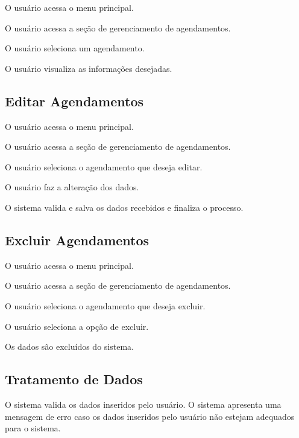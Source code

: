 \documentclass[12pt,a4paper]{article}
\begin{document}
\begin{fluxo}
  \item O usuário acessa o menu principal.
  \item O usuário acessa a seção de gerenciamento de agendamentos.
  \item O usuário seleciona um agendamento.
  \item O usuário visualiza as informações desejadas.
\end{fluxo}

\subsection{Editar Agendamentos}

\begin{fluxo}
  \item O usuário acessa o menu principal.
  \item O usuário acessa a seção de gerenciamento de agendamentos.
  \item O usuário seleciona o agendamento que deseja editar.
  \item O usuário faz a alteração dos dados.
  \item O sistema valida e salva os dados recebidos e finaliza o processo.
\end{fluxo}

\subsection{Excluir Agendamentos}

\begin{fluxo}
  \item O usuário acessa o menu principal.
  \item O usuário acessa a seção de gerenciamento de agendamentos.
  \item O usuário seleciona o agendamento que deseja excluir.
  \item O usuário seleciona a opção de excluir.
  \item Os dados são excluídos do sistema.
\end{fluxo}

\subsection{Tratamento de Dados}

O sistema valida os dados inseridos pelo usuário. O sistema apresenta uma
mensagem de erro caso os dados inseridos pelo usuário não estejam adequados
para o sistema.
\end{document}
